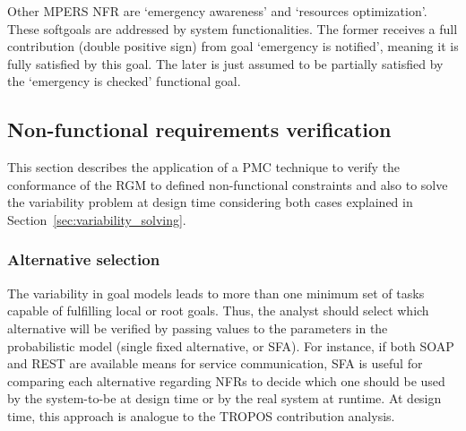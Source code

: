 
Other MPERS NFR are `emergency awareness' and `resources optimization'. These softgoals are addressed by system functionalities. The former receives a full contribution (double positive sign) from goal `emergency is notified', meaning it is fully satisfied by this goal. The later is just assumed to be partially satisfied by the `emergency is checked' functional goal.

\subsection{Non-functional requirements verification}



This section describes the application of a PMC technique to verify the conformance of the RGM to defined non-functional constraints and also to solve the variability problem at design time considering both cases explained in Section~\ref{sec:variability_solving}.

\subsubsection{Alternative selection}

The variability in goal models leads to more than one minimum set of tasks capable of fulfilling local or root goals. Thus, the analyst should select which alternative will be verified by passing values to the parameters in the probabilistic model (single fixed alternative, or SFA). For instance, if both SOAP and REST are available means for service communication, SFA is useful for comparing each alternative regarding NFRs to decide which one should be used by the system-to-be at design time or by the real system at runtime. At design time, this approach is analogue to the TROPOS contribution analysis. 


